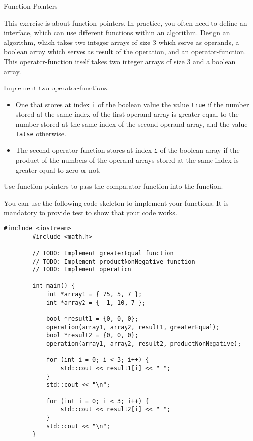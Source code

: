 \documentclass[12pt,a4paper]{scrartcl}
\begin{document}
\begin{aufgabe}[8]{Function Pointers}

	This exercise is about function pointers. In practice, you often need to define an interface, which can use different functions within an algorithm. Design an algorithm, which takes two integer arrays of size $3$ which serve as operands, a boolean array which serves as result of the operation, and an operator-function. This operator-function itself takes two integer arrays of size $3$ and a boolean array.

	Implement two operator-functions:
 \begin{itemize}
     \item One that stores at index \texttt{i} of the boolean value the value \texttt{true} if the number stored at the same index of the first operand-array is greater-equal to the number stored at the same index of the second operand-array, and the value \texttt{false} otherwise. 
     \item The second operator-function stores at index \texttt{i} of the boolean array if the product of the numbers of the operand-arrays stored at the same index is greater-equal to zero or not.
 \end{itemize}

	Use function pointers to pass the comparator function into the function.

	You can use the following code skeleton to implement your functions. It is mandatory to provide test to show that your code works.

	\begin{lstlisting}[gobble=8]
		#include <iostream>
		#include <math.h>
		
		// TODO: Implement greaterEqual function
		// TODO: Implement productNonNegative function
		// TODO: Implement operation
		
		int main() {
			int *array1 = { 75, 5, 7 };
			int *array2 = { -1, 10, 7 };
   
            bool *result1 = {0, 0, 0};
            operation(array1, array2, result1, greaterEqual);
            bool *result2 = {0, 0, 0};
            operation(array1, array2, result2, productNonNegative);
                
            for (int i = 0; i < 3; i++) {
                std::cout << result1[i] << " ";
            }
            std::cout << "\n";

            for (int i = 0; i < 3; i++) {
                std::cout << result2[i] << " ";
            }
            std::cout << "\n";
		}
	
	\end{lstlisting}
	
\end{aufgabe}
\end{document}
